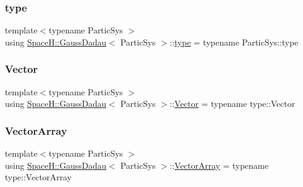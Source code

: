 \mbox{\label{class_space_h_1_1_gauss_dadau_a780629d19a82feeab959cd68c8a5f8a3}} 
\subsubsection{\texorpdfstring{type}{type}}
{\footnotesize\ttfamily template$<$typename Partic\+Sys $>$ \\
using \mbox{\hyperlink{class_space_h_1_1_gauss_dadau}{Space\+H\+::\+Gauss\+Dadau}}$<$ Partic\+Sys $>$\+::\mbox{\hyperlink{class_space_h_1_1_gauss_dadau_a780629d19a82feeab959cd68c8a5f8a3}{type}} =  typename Partic\+Sys\+::type}

\mbox{\label{class_space_h_1_1_gauss_dadau_a2019bc4c1ee812f59a32f9273c84f5be}} 
\subsubsection{\texorpdfstring{Vector}{Vector}}
{\footnotesize\ttfamily template$<$typename Partic\+Sys $>$ \\
using \mbox{\hyperlink{class_space_h_1_1_gauss_dadau}{Space\+H\+::\+Gauss\+Dadau}}$<$ Partic\+Sys $>$\+::\mbox{\hyperlink{class_space_h_1_1_gauss_dadau_a2019bc4c1ee812f59a32f9273c84f5be}{Vector}} =  typename type\+::\+Vector}

\mbox{\label{class_space_h_1_1_gauss_dadau_a69e00c49f96f4ffeeb767bb7222834da}} 
\subsubsection{\texorpdfstring{Vector\+Array}{VectorArray}}
{\footnotesize\ttfamily template$<$typename Partic\+Sys $>$ \\
using \mbox{\hyperlink{class_space_h_1_1_gauss_dadau}{Space\+H\+::\+Gauss\+Dadau}}$<$ Partic\+Sys $>$\+::\mbox{\hyperlink{class_space_h_1_1_gauss_dadau_a69e00c49f96f4ffeeb767bb7222834da}{Vector\+Array}} =  typename type\+::\+Vector\+Array}



